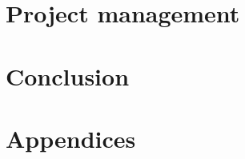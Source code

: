 \documentclass{article}
\begin{document}
\section{Project management}
\label{sec:project-mgmt}


\section{Conclusion}
\label{sec:conclusion}


\newpage
\nocite{*}
\printbibliography[heading=bibintoc]

\newpage
\section{Appendices}
\label{sec:appendices}

\end{document}
